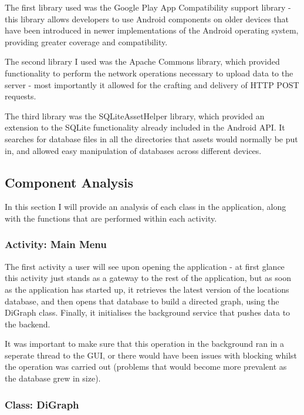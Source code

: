 \documentclass[11pt]{informatics-report}
\begin{document}
The first library used was the Google Play App Compatibility support library\cite{appcompat} - this library allows developers to use Android components on older devices that have been introduced in newer implementations of the Android operating system, providing greater coverage and compatibility. 

The second library I used was the Apache Commons library, which provided functionality to perform the network operations necessary to upload data to the server - most importantly it allowed for the crafting and delivery of HTTP POST requests.

The third library was the SQLiteAssetHelper library, which provided an extension to the SQLite functionality already included in the Android API. It searches for database files in all the directories that assets would normally be put in, and allowed easy manipulation of databases across different devices.

\subsection{Component Analysis}

In this section I will provide an analysis of each class in the application, along with the functions that are performed within each activity.

\subsubsection{Activity: Main Menu}

The first activity a user will see upon opening the application - at first glance this activity just stands as a gateway to the rest of the application, but as soon as the application has started up, it retrieves the latest version of the locations database, and then opens that database to build a directed graph, using the DiGraph class. Finally, it initialises the background service that pushes data to the backend.

It was important to make sure that this operation in the background ran in a seperate thread to the GUI, or there would have been issues with blocking whilst the operation was carried out (problems that would become more prevalent as the database grew in size).

\subsubsection{Class: DiGraph} 
\end{document}
